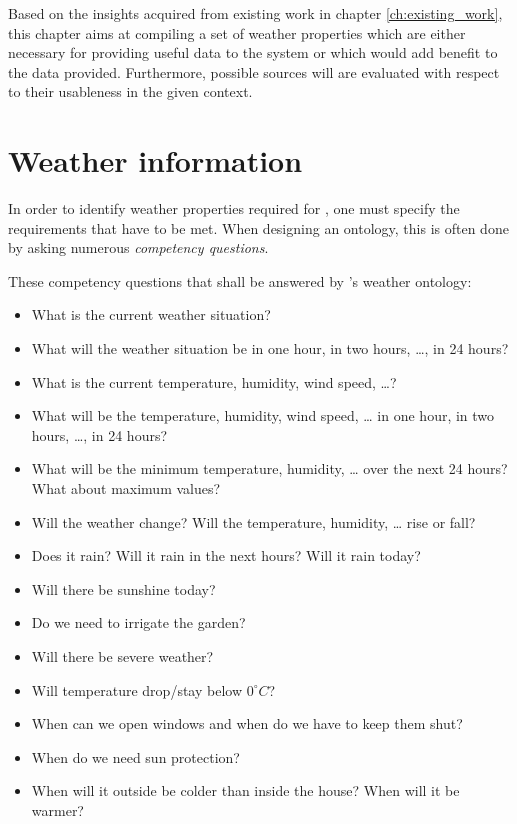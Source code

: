 Based on the insights acquired from existing work in chapter \ref{ch:existing_work}, this chapter aims at compiling a set of weather properties which are either necessary for providing useful data to the \thinkhome system or which would add benefit to the data provided. Furthermore, possible sources will are evaluated with respect to their usableness in the given context.

\section{Weather information}
\label{sec:weather_information}

In order to identify weather properties required for \thinkhome, one must specify the requirements that have to be met. When designing an ontology, this is often done by asking numerous \emph{competency questions}.

These competency questions that shall be answered by \thinkhome's weather ontology:

\begin{itemize}
  \item What is the current weather situation?
  \item What will the weather situation be in one hour, in two hours, …, in 24 hours?
  \item What is the current temperature, humidity, wind speed, …?
  \item What will be the temperature, humidity, wind speed, … in one hour, in two hours, …, in 24 hours?
  \item What will be the minimum temperature, humidity, … over the next 24 hours? What about maximum values?
  \item Will the weather change? Will the temperature, humidity, … rise or fall?
  \item Does it rain? Will it rain in the next hours? Will it rain today?
  \item Will there be sunshine today? 
  \item Do we need to irrigate the garden?
  \item Will there be severe weather?
  \item Will temperature drop/stay below $0^\circ C$?
  \item When can we open windows and when do we have to keep them shut?
  \item When do we need sun protection?
  \item When will it outside be colder than inside the house? When will it be warmer?
\end{itemize}

